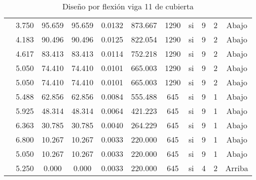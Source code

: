 \begin{table}[H]
{\begin{tabular}{|c|c|c|c|c|c|c|c|c|c|c|}
\cline{2-11}          & 3.750 & 95.659 & 95.659 & 0.0132 & 873.667 & 1290  & si    & 9     & 2     & Abajo \bigstrut\\
\cline{2-11}          & 4.183 & 90.496 & 90.496 & 0.0125 & 822.054 & 1290  & si    & 9     & 2     & Abajo \bigstrut\\
\cline{2-11}          & 4.617 & 83.413 & 83.413 & 0.0114 & 752.218 & 1290  & si    & 9     & 2     & Abajo \bigstrut\\
\cline{2-11}          & 5.050 & 74.410 & 74.410 & 0.0101 & 665.003 & 1290  & si    & 9     & 2     & Abajo \bigstrut\\
\cline{2-11}          & 5.050 & 74.410 & 74.410 & 0.0101 & 665.003 & 1290  & si    & 9     & 2     & Abajo \bigstrut\\
\cline{2-11}          & 5.488 & 62.856 & 62.856 & 0.0084 & 555.488 & 645   & si    & 9     & 1     & Abajo \bigstrut\\
\cline{2-11}          & 5.925 & 48.314 & 48.314 & 0.0064 & 421.223 & 645   & si    & 9     & 1     & Abajo \bigstrut\\
\cline{2-11}          & 6.363 & 30.785 & 30.785 & 0.0040 & 264.229 & 645   & si    & 9     & 1     & Abajo \bigstrut\\
\cline{2-11}          & 6.800 & 10.267 & 10.267 & 0.0033 & 220.000 & 645   & si    & 9     & 1     & Abajo \bigstrut\\
\cline{2-11}          & 5.050 & 10.267 & 10.267 & 0.0033 & 220.000 & 645   & si    & 9     & 1     & Abajo \bigstrut\\
\cline{2-11}          & 5.250 & 0.000 & 0.000 & 0.0033 & 220.000 & 645   & si    & 4     & 2     & Arriba \bigstrut\\
    \hline
    \end{tabular}}%
  \caption{Diseño por flexión viga 11 de cubierta}
  \label{tab:F V11C}%
\end{table}%
